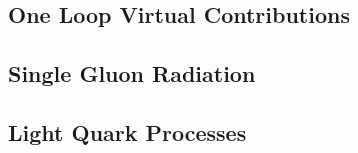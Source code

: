 \subsection{One Loop Virtual Contributions}


\subsection{Single Gluon Radiation}


\subsection{Light Quark Processes}

